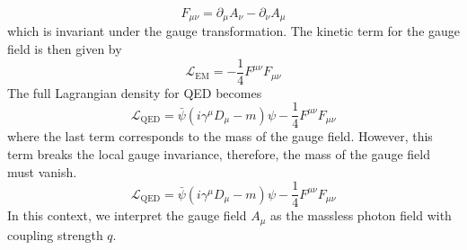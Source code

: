 \begin{equation}
  F_{\mu\nu} = \partial_{\mu}A_{\nu} - \partial_{\nu}A_{\mu}
  \label{eq:qed_field_strength_tensor}
\end{equation}
which is invariant under the gauge transformation. The kinetic term for the gauge field is then given by
\begin{equation}
  \mathcal{L}_{\mathrm{EM}} = - \frac{1}{4}F^{\mu\nu}F_{\mu\nu}
  \label{eq:qed_em_free_lagrangian}
\end{equation}
The full Lagrangian density for QED becomes
\begin{equation}
  \mathcal{L}_{\mathrm{QED}} = \bar{\psi}(i\gamma^{\mu}D_{\mu} - m)\psi - \frac{1}{4}F^{\mu\nu}F_{\mu\nu}
  \label{eq:qed_lagrangian}
\end{equation}
where the last term corresponds to the mass of the gauge field. However, this term breaks the local gauge invariance, therefore, the mass of the gauge field must vanish. 
\begin{equation}
  \mathcal{L}_{\mathrm{QED}} = \bar{\psi}(i\gamma^{\mu}D_{\mu} - m)\psi - \frac{1}{4}F^{\mu\nu}F_{\mu\nu}
  \label{eq:qed_lagrangian_final}
\end{equation}
In this context, we interpret the gauge field $A_{\mu}$ as the massless photon field with coupling strength $q$.

